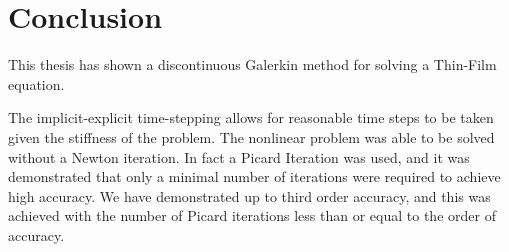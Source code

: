 
\chapter{Conclusion}\label{conclusion}
This thesis has shown a discontinuous Galerkin method for solving a Thin-Film equation.

The implicit-explicit time-stepping allows for reasonable time steps to be taken given
the stiffness of the problem.
The nonlinear problem was able to be solved without a Newton iteration.
In fact a Picard Iteration was used, and it was demonstrated that only a minimal
number of iterations were required to achieve high accuracy.
We have demonstrated up to third order accuracy, and this was achieved with the number
of Picard iterations less than or equal to the order of accuracy.

\clearpage
\pagebreak
